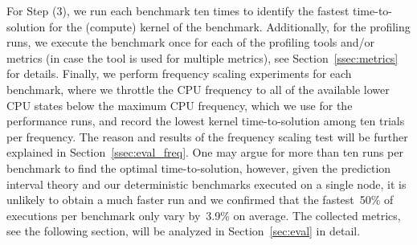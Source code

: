 %
For Step (3), we run each benchmark ten times to identify the fastest time-to-solution for the
(compute) kernel of the benchmark. Additionally, for the profiling runs, we execute the benchmark
once for each of the profiling tools and/or metrics (in case the tool is used for multiple metrics),
see Section~\ref{ssec:metrics} for details. Finally, we perform frequency scaling experiments
for each benchmark, where we throttle the CPU frequency to all of the available lower CPU states
below the maximum CPU frequency, which we use for the performance runs, and record the lowest kernel
time-to-solution among ten trials per frequency. The reason and results of the frequency scaling
test will be further explained in Section~\ref{ssec:eval_freq}.
One may argue for more than ten runs per benchmark to find the optimal time-to-solution, however,
given the prediction interval theory and our deterministic benchmarks executed on a single node,
it is unlikely to obtain a much faster run and we confirmed that the fastest~50\% of executions per
benchmark only vary by~3.9\% on average.
%
The collected metrics, see the following section, will be analyzed in Section~\ref{sec:eval} in detail.

